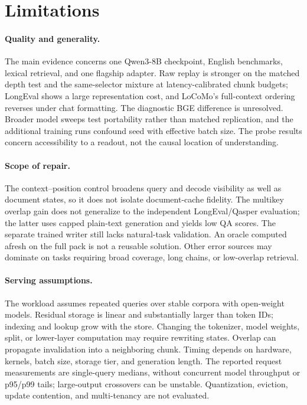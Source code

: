 \FloatBarrier
\section{Limitations}
\label{app:limitations}
\paragraph{Quality and generality.}
The main evidence concerns one Qwen3-8B checkpoint, English benchmarks, lexical retrieval, and one flagship adapter. Raw replay is stronger on the matched depth test and the same-selector mixture at latency-calibrated chunk budgets; LongEval shows a large representation cost, and LoCoMo's full-context ordering reverses under chat formatting. The diagnostic BGE difference is unresolved. Broader model sweeps test portability rather than matched replication, and the additional training runs confound seed with effective batch size. The probe results concern accessibility to a readout, not the causal location of understanding.

\paragraph{Scope of repair.}
The context--position control broadens query and decode visibility as well as document states, so it does not isolate document-cache fidelity. The multikey overlap gain does not generalize to the independent LongEval/Qasper evaluation; the latter uses capped plain-text generation and yields low QA scores. The separate trained writer still lacks natural-task validation. An oracle computed afresh on the full pack is not a reusable solution. Other error sources may dominate on tasks requiring broad coverage, long chains, or low-overlap retrieval.

\paragraph{Serving assumptions.}
The workload assumes repeated queries over stable corpora with open-weight models. Residual storage is linear and substantially larger than token IDs; indexing and lookup grow with the store. Changing the tokenizer, model weights, split, or lower-layer computation may require rewriting states. Overlap can propagate invalidation into a neighboring chunk. Timing depends on hardware, kernels, batch size, storage tier, and generation length. The reported request measurements are single-query medians, without concurrent model throughput or p95/p99 tails; large-output crossovers can be unstable. Quantization, eviction, update contention, and multi-tenancy are not evaluated.

